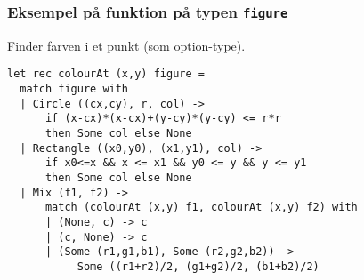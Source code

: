 \documentclass{beamer}
\begin{document}
\begin{frame}[fragile=singleslide]
\frametitle{Eksempel på funktion på typen \texttt{figure}}

Finder farven i et punkt (som option-type).

\begin{verbatim}
let rec colourAt (x,y) figure =
  match figure with
  | Circle ((cx,cy), r, col) ->
      if (x-cx)*(x-cx)+(y-cy)*(y-cy) <= r*r
      then Some col else None
  | Rectangle ((x0,y0), (x1,y1), col) ->
      if x0<=x && x <= x1 && y0 <= y && y <= y1
      then Some col else None
  | Mix (f1, f2) ->
      match (colourAt (x,y) f1, colourAt (x,y) f2) with
      | (None, c) -> c
      | (c, None) -> c
      | (Some (r1,g1,b1), Some (r2,g2,b2)) ->
           Some ((r1+r2)/2, (g1+g2)/2, (b1+b2)/2)
\end{verbatim}

\end{frame}
\end{document}
